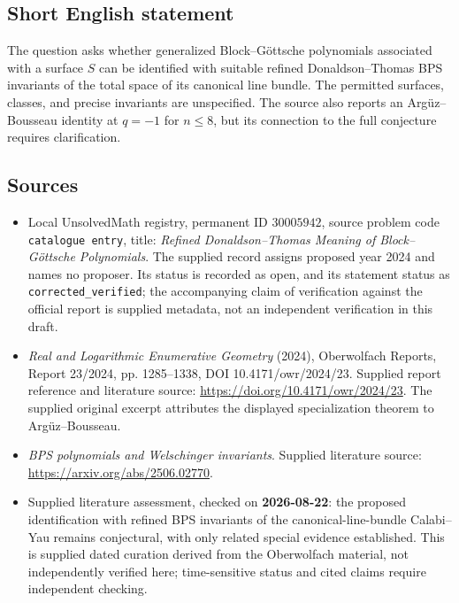 \documentclass[11pt]{article}
\begin{document}
\subsection{Short English statement}
The question asks whether generalized Block--Göttsche polynomials associated with a surface \(S\) can be identified with suitable refined Donaldson--Thomas BPS invariants of the total space of its canonical line bundle. The permitted surfaces, classes, and precise invariants are unspecified. The source also reports an Arg\"uz--Bousseau identity at \(q=-1\) for \(n\leq 8\), but its connection to the full conjecture requires clarification.
\subsection{Sources}
\begin{itemize}
\item Local UnsolvedMath registry, permanent ID \(30005942\), source problem code \texttt{catalogue entry}, title: \emph{Refined Donaldson--Thomas Meaning of Block--Göttsche Polynomials}. The supplied record assigns proposed year 2024 and names no proposer. Its status is recorded as open, and its statement status as \texttt{corrected\_verified}; the accompanying claim of verification against the official report is supplied metadata, not an independent verification in this draft.
\item \emph{Real and Logarithmic Enumerative Geometry} (2024), Oberwolfach Reports, Report 23/2024, pp. 1285--1338, DOI 10.4171/owr/2024/23. Supplied report reference and literature source: \url{https://doi.org/10.4171/owr/2024/23}. The supplied original excerpt attributes the displayed specialization theorem to Arg\"uz--Bousseau.
\item \emph{BPS polynomials and Welschinger invariants}. Supplied literature source: \url{https://arxiv.org/abs/2506.02770}.
\item Supplied literature assessment, checked on \textbf{2026-08-22}: the proposed identification with refined BPS invariants of the canonical-line-bundle Calabi--Yau remains conjectural, with only related special evidence established. This is supplied dated curation derived from the Oberwolfach material, not independently verified here; time-sensitive status and cited claims require independent checking.
\end{itemize}
\end{document}
